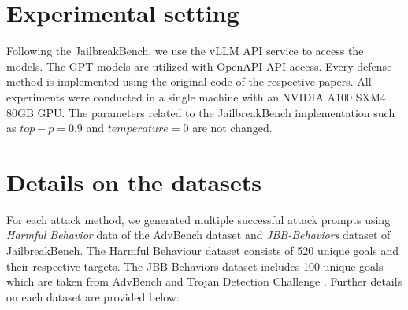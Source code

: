 \section{Experimental setting}
\label{app:sett}
Following the JailbreakBench, we use the vLLM API service to access the models. The GPT models are utilized with OpenAPI API access. Every defense method is implemented using the original code of the respective papers. All experiments were conducted in a single machine with an NVIDIA A100 SXM4 80GB GPU. The parameters related to the JailbreakBench implementation such as $top-p=0.9$ and $temperature=0$ are not changed. 

\section{Details on the datasets}
\label{app:dataset}

For each attack method, we generated multiple successful attack prompts using \textit{Harmful Behavior} data of the AdvBench dataset and \textit{JBB-Behaviors} dataset of JailbreakBench. The Harmful Behaviour dataset consists of 520 unique goals and their respective targets. The JBB-Behaviors dataset includes 100 unique goals which are taken from AdvBench and Trojan Detection Challenge \citep{tdc2023}. Further details on each dataset are provided below:

